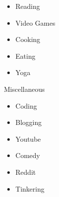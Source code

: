 \begin{minipage}{\dimexpr\textwidth-2ex}
\begin{multicols}{5}
\begin{itemize}[topsep=3pt,label=\textcolor{blue}{\textbullet},leftmargin=*]
        \item Reading
        \item Video Games
        \item Cooking
        \item Eating
        \item Yoga
    \end{itemize}
    \columnbreak
    {\color{cblue} Miscellaneous}
    \begin{itemize}[topsep=3pt,label=\textcolor{blue}{\textbullet},leftmargin=*]
        \itemsep-0.2em 
        \item Coding
        \item Blogging
        \item Youtube
        \item Comedy
        \item Reddit
        \item Tinkering
    \end{itemize}

\end{multicols}


\end{minipage}